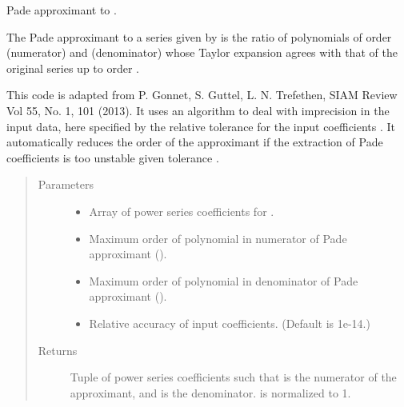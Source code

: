 \documentclass[letterpaper,10pt,english]{sphinxmanual}
\begin{document}
\begin{fulllineitems}
\label{\detokenize{g2tools:g2tools.pade_svd}}
\sphinxcode{\sphinxupquote{{[}m,n{]}}} Pade approximant to .

The \sphinxcode{\sphinxupquote{{[}m,n{]}}} Pade approximant to a series given by
 is the ratio of  polynomials of order 
(numerator) and  (denominator) whose  Taylor expansion agrees
with that of the original series up to order .

This code is adapted from P. Gonnet,  S. Guttel, L. N. Trefethen, SIAM
Review Vol 55, No. 1, 101 (2013). It uses an  algorithm to deal with
imprecision in the input data,  here specified by the relative tolerance
 for the  input coefficients . It automatically reduces
the order of the approximant if the extraction of Pade coefficients
is too unstable given tolerance .
\begin{quote}\begin{description}
\item[{Parameters}] \leavevmode\begin{itemize}
\item {} 
 \textendash{} Array  of power series coefficients for .

\item {} 
 \textendash{} Maximum order of polynomial in numerator of Pade
approximant ().

\item {} 
 \textendash{} Maximum order of polynomial in denominator of Pade
approximant ().

\item {} 
 \textendash{} Relative accuracy of input coefficients. (Default is 1e-14.)

\end{itemize}

\item[{Returns}] \leavevmode
Tuple of power series coefficients  such that
 is the numerator of the approximant,
and  is the denominator.  is
normalized to 1.

\end{description}\end{quote}

\end{fulllineitems}
\end{document}
